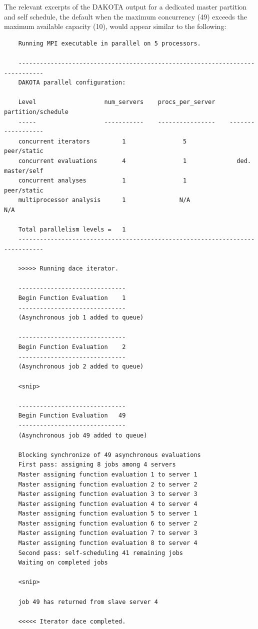 The relevant excerpts of the DAKOTA output for a dedicated master
partition and self schedule, the default when the maximum concurrency
(49) exceeds the maximum available capacity (10), would appear similar
to the following:
\begin{small}
\begin{verbatim}
    Running MPI executable in parallel on 5 processors.

    -----------------------------------------------------------------------------
    DAKOTA parallel configuration:

    Level                   num_servers    procs_per_server    partition/schedule
    -----                   -----------    ----------------    ------------------
    concurrent iterators         1                5              peer/static
    concurrent evaluations       4                1              ded. master/self
    concurrent analyses          1                1              peer/static
    multiprocessor analysis      1               N/A                N/A

    Total parallelism levels =   1
    -----------------------------------------------------------------------------

    >>>>> Running dace iterator.

    ------------------------------
    Begin Function Evaluation    1
    ------------------------------
    (Asynchronous job 1 added to queue)

    ------------------------------
    Begin Function Evaluation    2
    ------------------------------
    (Asynchronous job 2 added to queue)

    <snip>

    ------------------------------
    Begin Function Evaluation   49
    ------------------------------
    (Asynchronous job 49 added to queue)

    Blocking synchronize of 49 asynchronous evaluations
    First pass: assigning 8 jobs among 4 servers
    Master assigning function evaluation 1 to server 1
    Master assigning function evaluation 2 to server 2
    Master assigning function evaluation 3 to server 3
    Master assigning function evaluation 4 to server 4
    Master assigning function evaluation 5 to server 1
    Master assigning function evaluation 6 to server 2
    Master assigning function evaluation 7 to server 3
    Master assigning function evaluation 8 to server 4
    Second pass: self-scheduling 41 remaining jobs
    Waiting on completed jobs

    <snip>

    job 49 has returned from slave server 4

    <<<<< Iterator dace completed.
\end{verbatim}
\end{small}

